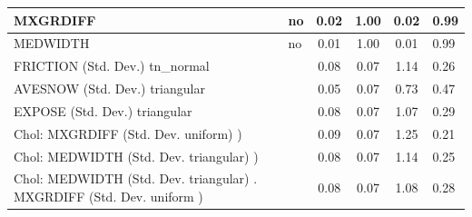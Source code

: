 \begin{table}
\begin{center}
\begin{tabular}{|l|l|c|c|c|l|}
			\hline
			MXGRDIFF & no & 0.02 & 1.00 & 0.02 & 0.99 \\
			\hline
			MEDWIDTH & no & 0.01 & 1.00 & 0.01 & 0.99 \\
			\hline
			FRICTION (Std. Dev.) tn_normal &  & 0.08 & 0.07 & 1.14 & 0.26 \\
			\hline
			AVESNOW (Std. Dev.) triangular &  & 0.05 & 0.07 & 0.73 & 0.47 \\
			\hline
			EXPOSE (Std. Dev.) triangular &  & 0.08 & 0.07 & 1.07 & 0.29 \\
			\hline
			 Chol: MXGRDIFF (Std. Dev. uniform) ) &  & 0.09 & 0.07 & 1.25 & 0.21 \\
			\hline
			 Chol: MEDWIDTH (Std. Dev. triangular) ) &  & 0.08 & 0.07 & 1.14 & 0.25 \\
			\hline
			 Chol: MEDWIDTH (Std. Dev. triangular) . MXGRDIFF (Std. Dev.   uniform ) &  & 0.08 & 0.07 & 1.08 & 0.28 \\
			\hline
		\end{tabular}
	\end{center}
\end{table}